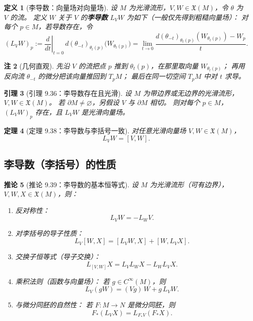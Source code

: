\documentclass[11pt]{article}
\newtheorem{definition}{定义}[section]
\newtheorem{theorem}[definition]{定理}
\newtheorem{lemma}[definition]{引理}
\newtheorem{corollary}[definition]{推论}
\newtheorem{remark}[definition]{注}
\newcommand{\X}{\mathfrak{X}}
\begin{document}
\begin{definition}[李导数：向量场对向量场]
设 $M$ 为光滑流形，$V,W\in\X(M)$，令 $\theta$ 为 $V$ 的流。
定义 $W$ 关于 $V$ 的\textbf{李导数} $L_VW$ 为如下（一般仅先得到粗糙向量场）：
对每个 $p\in M$，若导数存在，令
\[
(L_VW)_p
:=\left.\frac{d}{dt}\right|_{t=0} \, d(\theta_{-t})_{\theta_t(p)}\bigl(W_{\theta_t(p)}\bigr)
=\lim_{t\to 0}\frac{d(\theta_{-t})_{\theta_t(p)}(W_{\theta_t(p)})-W_p}{t}.
\tag{9.16}
\]
\end{definition}

\begin{remark}[几何直观]
先沿 $V$ 的流把点 $p$ 推到 $\theta_t(p)$，在那里取向量 $W_{\theta_t(p)}$；
再用反向流 $\theta_{-t}$ 的微分把该向量推回到 $T_pM$；
最后在同一切空间 $T_pM$ 中对 $t$ 求导。
\end{remark}

\begin{lemma}[引理 9.36：李导数存在且光滑]
设 $M$ 为带边界或无边界的光滑流形，$V,W\in\X(M)$。
若 $\partial M\neq\varnothing$，另假设 $V$ 与 $\partial M$ 相切。
则对每个 $p\in M$，$(L_VW)_p$ 存在，且 $L_VW$ 是光滑向量场。
\end{lemma}

\begin{theorem}[定理 9.38：李导数与李括号一致]
对任意光滑向量场 $V,W\in\X(M)$，
\[
L_VW=[V,W].
\]
\end{theorem}

\subsection{李导数（李括号）的性质}

\begin{corollary}[推论 9.39：李导数的基本恒等式]
设 $M$ 为光滑流形（可有边界），$V,W,X\in\X(M)$，则：
\begin{enumerate}[label=(\alph*)]
\item 反对称性：
\[
L_VW=-L_WV.
\]
\item 对李括号的导子性质：
\[
L_V[W,X]=[L_VW,X]+[W,L_VX].
\]
\item 交换子恒等式（导子交换）：
\[
L_{[V,W]}X=L_VL_WX-L_WL_VX.
\]
\item 乘积法则（函数与向量场）：
若 $g\in C^\infty(M)$，则
\[
L_V(gW)=(Vg)\,W+g\,L_VW.
\]
\item 与微分同胚的自然性：
若 $F:M\to N$ 是微分同胚，则
\[
F_*(L_VX)=L_{F_*V}(F_*X).
\]
\end{enumerate}
\end{corollary}
\end{document}
